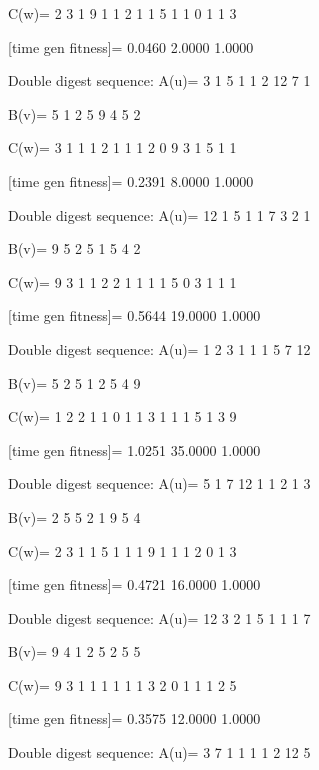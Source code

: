 C(w)=
     2     3     1     9     1     1     2     1     1     5     1     1     0     1     1     3

[time gen fitness]=
    0.0460    2.0000    1.0000

Double digest sequence:
A(u)=
     3     1     5     1     1     2    12     7     1

B(v)=
     5     1     2     5     9     4     5     2

C(w)=
     3     1     1     1     2     1     1     1     2     0     9     3     1     5     1     1

[time gen fitness]=
    0.2391    8.0000    1.0000

Double digest sequence:
A(u)=
    12     1     5     1     1     7     3     2     1

B(v)=
     9     5     2     5     1     5     4     2

C(w)=
     9     3     1     1     2     2     1     1     1     1     5     0     3     1     1     1

[time gen fitness]=
    0.5644   19.0000    1.0000

Double digest sequence:
A(u)=
     1     2     3     1     1     1     5     7    12

B(v)=
     5     2     5     1     2     5     4     9

C(w)=
     1     2     2     1     1     0     1     1     3     1     1     1     5     1     3     9

[time gen fitness]=
    1.0251   35.0000    1.0000

Double digest sequence:
A(u)=
     5     1     7    12     1     1     2     1     3

B(v)=
     2     5     5     2     1     9     5     4

C(w)=
     2     3     1     1     5     1     1     1     9     1     1     1     2     0     1     3

[time gen fitness]=
    0.4721   16.0000    1.0000

Double digest sequence:
A(u)=
    12     3     2     1     5     1     1     1     7

B(v)=
     9     4     1     2     5     2     5     5

C(w)=
     9     3     1     1     1     1     1     1     3     2     0     1     1     1     2     5

[time gen fitness]=
    0.3575   12.0000    1.0000

Double digest sequence:
A(u)=
     3     7     1     1     1     1     2    12     5

